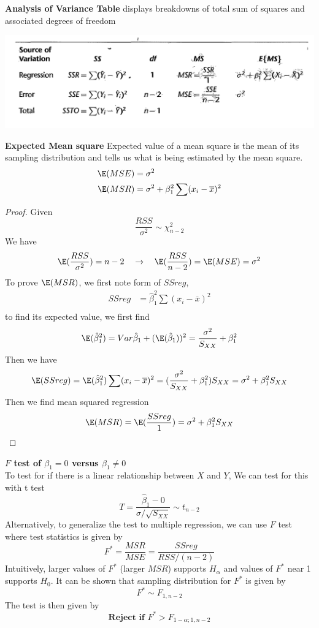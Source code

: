 \documentclass[11pt]{article}
\begin{document}
\begin{defn*}
	\textbf{Analysis of Variance Table} displays breakdowns of total sum of squares and associated degrees of freedom
	\begin{center}
		\includegraphics[width=\textwidth]{anova_table}
	\end{center}
\end{defn*}

\begin{defn*}
	\textbf{Expected Mean square} Expected value of a mean square is the mean of its sampling distribution and tells us what is being estimated by the mean square. 
	\begin{align*}
		\E(MSE) &= \sigma^2 \\
		\E(MSR) &= \sigma^2 + \beta_1^2 \sum (x_i - \overline{x})^2
	\end{align*}
	\begin{proof}
		Given 
		\[
			\frac{RSS}{\sigma^2} \sim \chi^2_{n-2}
		\]
		We have 
		\[
			\E(\frac{RSS}{\sigma^2}) = n-2 \quad \to \quad \E(\frac{RSS}{n-2}) = \E(MSE) = \sigma^2
		\]
		To prove $\E(MSR)$, we first note form of $SSreg$,
		\begin{align*}
			SSreg 
			&= \hat{\beta}_1^2 \sum (x_i - \overline{x})^2 \\
		\end{align*}
		to find its expected value, we first find 
		\[
			\E(\hat{\beta}_1^2) 
			= Var{\hat{\beta}_1} + (\E(\hat{\beta}_1))^2
			= \frac{\sigma^2}{S_{XX}} + \beta_1^2 
		\]
		Then we have 
		\[
			\E(SSreg) 
			= \E(\hat{\beta}_1^2) \sum (x_i - \overline{x})^2
			= (\frac{\sigma^2}{S_{XX}} + \beta_1^2 ) S_{XX}
			= \sigma^2 + \beta_1^2 S_{XX}
		\]
		Then we find mean squared regression 
		\[
			\E(MSR) = \E(\frac{SSreg}{1}) = \sigma^2 + \beta_1^2 S_{XX}
		\]
	\end{proof}
\end{defn*}


\begin{defn*}
	\textbf{$F$ test of $\beta_1 = 0$ versus $\beta_1 \neq 0$}\\
	To test for if there is a linear relationship between $X$ and $Y$,
	We can test for this with t test 
	\[
		T = \frac{\hat{\beta}_1 - 0}{\sigma / \sqrt{S_{XX}}} \sim t_{n-2} 
	\]
	Alternatively, to generalize the test to multiple regression, we can use $F$ test where test statistics is given by 
	\[
		F^* = \frac{MSR}{MSE} = \frac{SSreg}{RSS/(n-2)}
	\]
	Intuitively, larger values of $F^*$ (larger $MSR$) supports $H_{\alpha}$ and values of $F^*$ near 1 supports $H_0$. It can be shown that sampling distribution for $F^*$ is given by 
	\[
		F^* \sim F_{1, n-2}
	\]
	The test is then given by 
	\[
		\textbf{Reject if } F^* > F_{1-\alpha; 1, n-2} 
	\]
\end{defn*}
\end{document}
